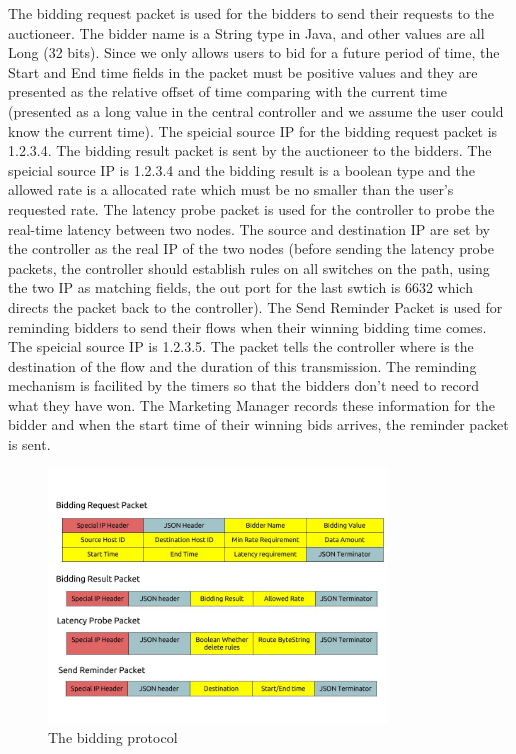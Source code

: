 \documentclass[a4paper,11pt,twocolumn]{article}
\begin{document}
The bidding request packet is used for the bidders to send their requests to the auctioneer. The bidder name is a String type in Java, and other 
values are all Long (32 bits). Since we only allows users to bid 
for a future period of time, the Start and End time fields in the packet must be positive values and they 
are presented as the relative offset of time comparing with the current time (presented as a long value in the central controller and
we assume the user could know the current time). The speicial source IP for the bidding request packet is 1.2.3.4. The bidding result packet is sent by the auctioneer to the 
bidders. The speicial source IP is 1.2.3.4 and the bidding result is a boolean type and the allowed rate is a allocated rate which must be no smaller than the 
user's requested rate. The latency probe packet is used for the controller to probe the real-time latency between two nodes. The source and destination IP
are set by the controller as the real IP of the two nodes (before sending the latency probe packets, the controller should establish rules on all
switches on the path, using the two IP as matching fields, the out port for the last swtich is 6632 which directs the packet back to the controller).
The Send Reminder Packet is used for reminding bidders to send their flows when their winning bidding time comes. The speicial source IP is 1.2.3.5. The 
packet tells the controller where is the destination of the flow and the duration of this transmission. The reminding mechanism is facilited by the 
timers so that the bidders don't need to record what they have won. The Marketing Manager records these information for the bidder and when the start time 
of their winning bids arrives, the reminder packet is sent.

\begin{figure}[ht!]
\centering
\includegraphics[width=90mm]{protocol.jpg}
\caption{The bidding protocol}
\label{overflow}
\end{figure}
\end{document}
